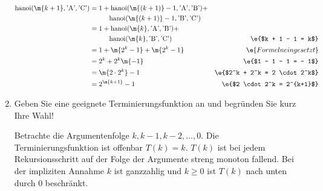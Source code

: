 \documentclass{bschlangaul-aufgabe}
\begin{document}
\begin{enumerate}
\begin{bAntwort}
\begin{align*}
\text{hanoi}(\m{k + 1}, \text{'A'},\text{'C'})
& = 1 +
    \text{hanoi}(\m{(k + 1)} - 1, \text{'A'},\text{'B'}) + \\
    & \hspace{1cm}
    \text{hanoi}(\m{(k + 1)} - 1, \text{'B'},\text{'C'})\\
& = 1 +
    \text{hanoi}(\m{k}, \text{'A'},\text{'B'}) +\\
    & \hspace{1cm}
    \text{hanoi}(\m{k}, \text{'B'},\text{'C'})
& \e{$k + 1 - 1 = k$}\\
%
& = 1 +
    \m{2^k - 1} + \m{2^k - 1}
& \e{Formeln eingesetzt}\\
%
& = 2^k + 2^k \m{- 1}
& \e{$1 - 1 - 1 = - 1$}\\
%
& = \m{2 \cdot 2^k} - 1
& \e{$2^k + 2^k = 2 \cdot 2^k$}
\\
& = 2^{\m{k+1}} - 1 & \e{$2 \cdot 2^k = 2^{k+1}$} \\
\end{align*}

\end{bAntwort}


\item Geben Sie eine geeignete
Terminierungsfunktion an und begründen Sie
kurz Ihre Wahl!

\begin{bAntwort}
Betrachte die Argumentenfolge $k, k-1, k-2, \dots, 0$. Die
Terminierungsfunktion ist offenbar $T(k) = k$. $T(k)$ ist bei jedem
Rekursionsschritt auf der Folge der Argumente streng monoton fallend.
Bei der impliziten Annahme $k$ ist ganzzahlig und $k \geq 0$ ist $T(k)$
nach unten durch $0$ beschränkt.
\end{bAntwort}
\end{enumerate}
\end{document}
